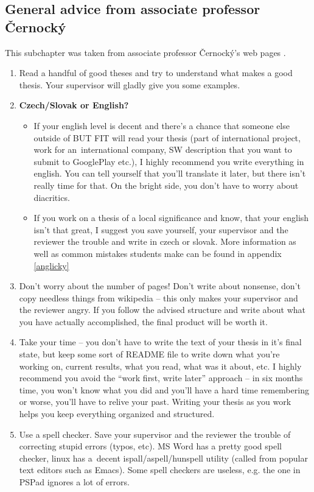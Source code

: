 {{\subsection*{General advice from associate professor Černocký}

This subchapter was taken from associate professor Černocký's web pages \cite{Cernocky}.

\begin{enumerate}
  \item{Read a handful of good theses and try to understand what makes a good thesis. Your supervisor will gladly give you some examples.}
  \item{\textbf{Czech/Slovak or English?}
  	\begin{itemize}
  	\item If your english level is decent and there's a chance that someone else outside of BUT FIT will read your thesis (part of international project, work for an~international company, SW description that you want to submit to GooglePlay etc.), I highly recommend you write everything in english. You can tell yourself that you'll translate it later, but there isn't really time for that. On the bright side, you don't have to worry about diacritics.
    \item If you work on a thesis of a local significance and know, that your english isn't that great, I suggest you save yourself, your supervisor and the reviewer the trouble and write in czech or slovak. More information as well as common mistakes students make can be found in appendix \ref{anglicky}
  	\end{itemize}
  }
  \item{Don't worry about the number of pages! Don't write about nonsense, don't copy needless things from wikipedia -- this only makes your supervisor and the reviewer angry. If you follow the advised structure and write about what you have actually accomplished, the final product will be worth it.}
  \item{Take your time -- you don't have to write the text of your thesis in it's final state, but keep some sort of README file to write down what you're working on, current results, what you read, what was it about, etc. I highly recommend you avoid the ``work first, write later'' approach -- in six months time, you won't know what you did and you'll have a hard time remembering or worse, you'll have to relive your past. Writing your thesis as you work helps you keep everything organized and structured.}
  \item{Use a spell checker. Save your supervisor and the reviewer the trouble of correcting stupid errors (typos, etc). MS Word has a pretty good spell checker, linux has a~decent ispall/aspell/hunspell utility (called from popular text editors such as Emacs). Some spell checkers are useless, e.g. the one in PSPad ignores a lot of errors.}

\end{enumerate}}}
